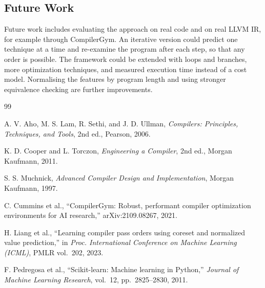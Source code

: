 \documentclass[12pt,a4paper]{article}
\begin{document}
\subsection{Future Work}

Future work includes evaluating the approach on real code and on real LLVM IR, for example through CompilerGym. An iterative version could predict one technique at a time and re-examine the program after each step, so that any order is possible. The framework could be extended with loops and branches, more optimization techniques, and measured execution time instead of a cost model. Normalising the features by program length and using stronger equivalence checking are further improvements.

\newpage

\begin{thebibliography}{99}

A. V. Aho, M. S. Lam, R. Sethi, and J. D. Ullman,
\textit{Compilers: Principles, Techniques, and Tools},
2nd ed., Pearson, 2006.

K. D. Cooper and L. Torczon,
\textit{Engineering a Compiler},
2nd ed., Morgan Kaufmann, 2011.

S. S. Muchnick,
\textit{Advanced Compiler Design and Implementation},
Morgan Kaufmann, 1997.

C. Cummins et al.,
``CompilerGym: Robust, performant compiler optimization environments for AI
research,'' arXiv:2109.08267, 2021. %

H. Liang et al.,
``Learning compiler pass orders using coreset and normalized value
prediction,'' in \textit{Proc. International Conference on Machine Learning
(ICML)}, PMLR vol.\ 202, 2023. %

F. Pedregosa et al.,
``Scikit-learn: Machine learning in Python,''
\textit{Journal of Machine Learning Research}, vol.\ 12, pp.\ 2825--2830, 2011.


\end{thebibliography}
\end{document}
